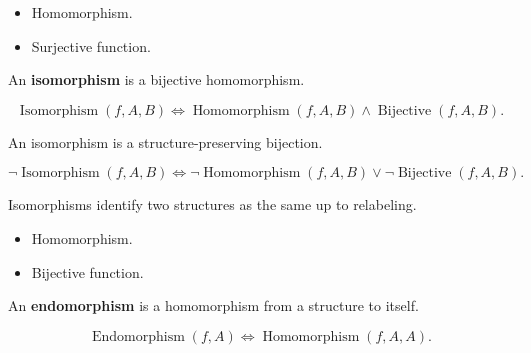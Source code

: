 \begin{remark*}[Dependencies]
\begin{itemize}
  \item Homomorphism.
  \item Surjective function.
\end{itemize}
\end{remark*}

\begin{definition}[Isomorphism]
\label{def:isomorphism}
An \textbf{isomorphism} is a bijective homomorphism.
\end{definition}

\begin{remark*}
\[
\operatorname{Isomorphism}(f,A,B)
\Longleftrightarrow
\operatorname{Homomorphism}(f,A,B)
\land
\operatorname{Bijective}(f,A,B).
\]
\end{remark*}

\begin{remark*}
An isomorphism is a structure-preserving bijection.
\end{remark*}

\begin{remark*}
\[
\neg\operatorname{Isomorphism}(f,A,B)
\Longleftrightarrow
\neg\operatorname{Homomorphism}(f,A,B)
\lor
\neg\operatorname{Bijective}(f,A,B).
\]
\end{remark*}

\begin{remark*}[Interpretation]
Isomorphisms identify two structures as the same up to relabeling.
\end{remark*}

\begin{remark*}[Dependencies]
\begin{itemize}
  \item Homomorphism.
  \item Bijective function.
\end{itemize}
\end{remark*}

\begin{definition}[Endomorphism]
\label{def:endomorphism}
An \textbf{endomorphism} is a homomorphism from a structure to itself.
\end{definition}

\begin{remark*}
\[
\operatorname{Endomorphism}(f,A)
\Longleftrightarrow
\operatorname{Homomorphism}(f,A,A).
\]
\end{remark*}

